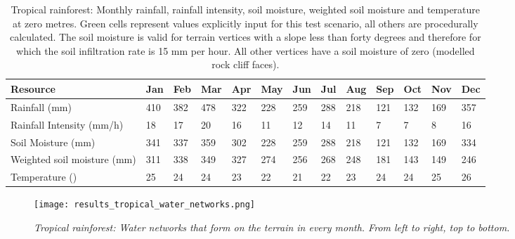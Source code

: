 \begin{table}[htb!]
  \centering
	    \begin{tabular}{|p{3cm}|p{.7cm}|p{.7cm}|p{.7cm}|p{.7cm}|p{.7cm}|p{.7cm}|p{.7cm}|p{.7cm}|p{.7cm}|p{.7cm}|p{.7cm}|p{.7cm}|}
		\hline	
  	    \textbf{Resource} & \textbf{Jan} & \textbf{Feb} & \textbf{Mar} & \textbf{Apr} & \textbf{May} & \textbf{Jun} & \textbf{Jul} & \textbf{Aug} & \textbf{Sep} & \textbf{Oct} & \textbf{Nov} & \textbf{Dec} \\
  	    \hline	
		Rainfall (mm) & \cellcolor{green}410 & \cellcolor{green}382 & \cellcolor{green}478 & \cellcolor{green}322 & \cellcolor{green}228 & \cellcolor{green}259 & \cellcolor{green}288 & \cellcolor{green}218 & \cellcolor{green}121 & \cellcolor{green}132 & \cellcolor{green}169 & \cellcolor{green}357  \\
		\hline
		Rainfall Intensity (mm/h) & \cellcolor{green}18 & \cellcolor{green}17 & \cellcolor{green}20 & \cellcolor{green}16 & \cellcolor{green}11 & \cellcolor{green}12 & \cellcolor{green}14 & \cellcolor{green}11 & \cellcolor{green}7 & \cellcolor{green}7 & \cellcolor{green}8 & \cellcolor{green}16  \\
		\hline
		Soil Moisture (mm) & 341 & 337 & 359 & 302 & 228 & 259 & 288 & 218 & 121 & 132 & 169 & 334  \\
		\hline
		Weighted soil moisture (mm)	& 311 & 338	& 349 & 327 & 274 & 256 & 268 & 248 & 181 & 143 & 149 & 246 \\
		\hline
		Temperature (\textdegree) & 25 & 24 & 24 & 23 & 22 & \cellcolor{green}21 & 22 & 23 & 24 & 24 & 25 & \cellcolor{green}26  \\
		\hline
		\end{tabular}
		\caption{Tropical rainforest: Monthly rainfall, rainfall intensity, soil moisture, weighted soil moisture and temperature at zero metres. Green cells represent values explicitly input for this test scenario, all others are procedurally calculated. The soil moisture is valid for terrain vertices with a slope less than forty degrees and therefore for which the soil infiltration rate is 15 mm per hour. All other vertices have a soil moisture of zero (modelled rock cliff faces).}
	  \label{tab:results_tropical_input_resources}
\end{table}

\begin{figure}[htb!]
\center
	\texttt{[image: results\_tropical\_water\_networks.png]}
	\caption{ \textit{Tropical rainforest: Water networks that form on the terrain in every month. From left to right, top to bottom.}}
	\label{fig:results_tropical_water_networks}
\end{figure}

